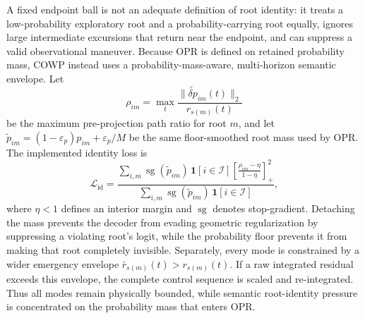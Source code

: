 \documentclass[10pt]{article}
\begin{document}
A fixed endpoint ball is not an adequate definition of root identity: it treats a low-probability exploratory root and a probability-carrying root equally, ignores large intermediate excursions that return near the endpoint, and can suppress a valid observational maneuver. Because OPR is defined on retained probability mass, COWP instead uses a probability-mass-aware, multi-horizon semantic envelope. Let
\begin{equation}
    \rho_{im}
    =
    \max_t
    \frac{\|\widetilde{\delta p}_{im}(t)\|_2}{r_{s(m)}(t)}
\end{equation}
be the maximum pre-projection path ratio for root $m$, and let $\widetilde p_{im}=(1-\varepsilon_p)p_{im}+\varepsilon_p/M$ be the same floor-smoothed root mass used by OPR. The implemented identity loss is
\begin{equation}
    \mathcal{L}_{\mathrm{id}}
    =
    \frac{
      \sum_{i,m}\operatorname{sg}(\widetilde p_{im})\,
      \mathbf{1}[i\in\mathcal I]
      \left[
        \frac{\rho_{im}-\eta}{1-\eta}
      \right]_+^2
    }{
      \sum_{i,m}\operatorname{sg}(\widetilde p_{im})\,
      \mathbf{1}[i\in\mathcal I]
    },
    \label{eq:natural_mass_envelope}
\end{equation}
where $\eta<1$ defines an interior margin and $\operatorname{sg}$ denotes stop-gradient. Detaching the mass prevents the decoder from evading geometric regularization by suppressing a violating root's logit, while the probability floor prevents it from making that root completely invisible. Separately, every mode is constrained by a wider emergency envelope $\bar r_{s(m)}(t)>r_{s(m)}(t)$. If a raw integrated residual exceeds this envelope, the complete control sequence is scaled and re-integrated. Thus all modes remain physically bounded, while semantic root-identity pressure is concentrated on the probability mass that enters OPR.
\end{document}

